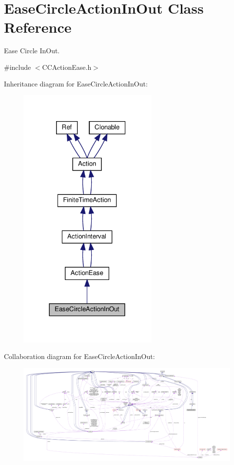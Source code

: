 \hypertarget{classEaseCircleActionInOut}{}\section{Ease\+Circle\+Action\+In\+Out Class Reference}
\label{classEaseCircleActionInOut}


Ease Circle In\+Out.  




{\ttfamily \#include $<$C\+C\+Action\+Ease.\+h$>$}



Inheritance diagram for Ease\+Circle\+Action\+In\+Out\+:
\nopagebreak
\begin{figure}[H]
\begin{center}
\leavevmode
\includegraphics[width=197pt]{classEaseCircleActionInOut__inherit__graph}
\end{center}
\end{figure}


Collaboration diagram for Ease\+Circle\+Action\+In\+Out\+:
\nopagebreak
\begin{figure}[H]
\begin{center}
\leavevmode
\includegraphics[width=350pt]{classEaseCircleActionInOut__coll__graph}
\end{center}
\end{figure}
